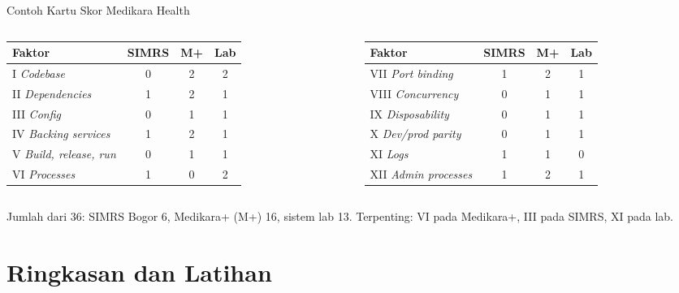 \documentclass[aspectratio=169, table, 12pt]{beamer}
\begin{document}
\begin{frame}{{\Large Contoh Kartu Skor Medikara Health}}
  \vspace{2pt}
  \scriptsize
  \begin{columns}[t]
    \begin{tabularx}{\linewidth}{|Y|c|c|c|}
      \hline
      \textbf{Faktor} & \textbf{SIMRS} & \textbf{M+} & \textbf{Lab} \\
      \hline
      I \textit{Codebase} & 0 & 2 & 2 \\
      \hline
      II \textit{Dependencies} & 1 & 2 & 1 \\
      \hline
      III \textit{Config} & 0 & 1 & 1 \\
      \hline
      IV \textit{Backing services} & 1 & 2 & 1 \\
      \hline
      V \textit{Build, release, run} & 0 & 1 & 1 \\
      \hline
      VI \textit{Processes} & 1 & 0 & 2 \\
      \hline
    \end{tabularx}
    \begin{tabularx}{\linewidth}{|Y|c|c|c|}
      \hline
      \textbf{Faktor} & \textbf{SIMRS} & \textbf{M+} & \textbf{Lab} \\
      \hline
      VII \textit{Port binding} & 1 & 2 & 1 \\
      \hline
      VIII \textit{Concurrency} & 0 & 1 & 1 \\
      \hline
      IX \textit{Disposability} & 0 & 1 & 1 \\
      \hline
      X \textit{Dev/prod parity} & 0 & 1 & 1 \\
      \hline
      XI \textit{Logs} & 1 & 1 & 0 \\
      \hline
      XII \textit{Admin processes} & 1 & 2 & 1 \\
      \hline
    \end{tabularx}
  \end{columns}

  \vspace{8pt}
  \small Jumlah dari 36: SIMRS Bogor 6, Medikara+ (M+) 16, sistem lab 13.
  Terpenting: VI pada Medikara+, III pada SIMRS, XI pada lab.
\end{frame}

\section{Ringkasan dan Latihan}
\end{document}
